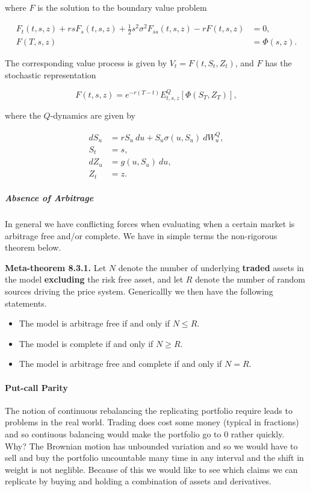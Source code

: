 \documentclass[
]{article}
\providecommand{\tightlist}{%
  \setlength{\itemsep}{0pt}\setlength{\parskip}{0pt}}
\begin{document}
where \(F\) is the solution to the boundary value problem

\begin{align*}
F_t(t,s,z)+rsF_s(t,s,z)+\frac{1}{2}s^2\sigma^2F_{ss}(t,s,z)-rF(t,s,z)&=0,\\
F(T,s,z)&=\Phi(s,z).
\end{align*}

The corresponding value process is given by \(V_t=F(t,S_t,Z_t)\), and
\(F\) has the stochastic representation

\[
F(t,s,z)=e^{-r(T-t)}E^Q_{t,s,z}[\Phi(S_T,Z_T)],
\]

where the \(Q\)-dynamics are given by

\begin{align*}
dS_u&=rS_u\ du + S_u\sigma(u,S_u)\ dW^Q_u,\\
S_t&=s,\\
dZ_u&=g(u,S_u)\ du,\\
Z_t&=z.
\end{align*}

\hypertarget{absence-of-arbitrage-1}{%
\subparagraph{Absence of Arbitrage}\label{absence-of-arbitrage-1}}

In general we have conflicting forces when evaluating when a certain
market is arbitrage free and/or complete. We have in simple terms the
non-rigorous theorem below.

\textbf{Meta-theorem 8.3.1.} Let \(N\) denote the number of underlying
\textbf{traded} assets in the model \textbf{excluding} the risk free
asset, and let \(R\) denote the number of random sources driving the
price system. Genericallly we then have the following statements.

\begin{itemize}
\tightlist
\item
  The model is arbitrage free if and only if \(N\le R\).
\item
  The model is complete if and only if \(N\ge R\).
\item
  The model is arbitrage free and complete if and only if \(N=R\).
\end{itemize}

\hypertarget{put-call-parity}{%
\paragraph{Put-call Parity}\label{put-call-parity}}

The notion of continuous rebalancing the replicating portfolio require
leads to problems in the real world. Trading does cost some money
(typical in fractions) and so contiuous balancing would make the
portfolio go to 0 rather quickly. Why? The Brownian motion has unbounded
variation and so we would have to sell and buy the portfolio uncountable
many time in any interval and the shift in weight is not neglible.
Because of this we would like to see which claims we can replicate by
buying and holding a combination of assets and derivatives.
\end{document}
